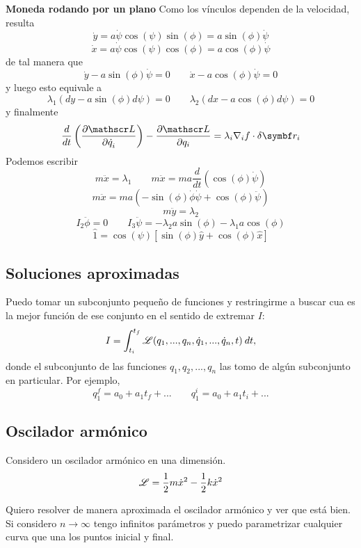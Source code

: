 \documentclass[10pt,oneside]{CBFT_book}
\begin{document}
\begin{ejemplo}{\bf Moneda rodando por un plano}
Como los vínculos dependen de la velocidad, resulta 
\[
	\dot{y} = a\dot{\psi} \cos(\psi) \sin(\phi) = a \sin(\phi) \dot{\psi}
\]
\[
	\dot{x} = a\dot{\psi} \cos(\psi) \cos(\phi) = a \cos(\phi) \dot{\psi}
\]
de tal manera que 
\[
	\dot{y} - a \sin(\phi) \dot{\psi} = 0 \qquad \dot{x} - a \cos(\phi) \dot{\psi} = 0
\]
y luego esto equivale a 
\[
	\lambda_1(dy - a \sin(\phi) d\psi) = 0 \qquad \lambda_2(dx - a \cos(\phi) d\psi)= 0
\]
y finalmente 
\[
	\frac{d}{dt}\left(\dpar{\Lag}{\dot{q}_i}\right) - \dpar{\Lag}{q_i} =
	\lambda_i \nabla_i f \cdot \delta \vb{r}_i
\]
Podemos escribir
\[
	m \ddot{x} = \lambda_1 \qquad m \ddot{x} = m a \frac{d}{dt}( \cos(\phi)\dot{\psi} )
\]
\[
	m \ddot{x} = m a ( -\sin(\phi)\dot{\phi}\dot{\psi} + \cos(\phi)\ddot{\psi} )
\]
\[
	m \ddot{y} = \lambda_2
\]
\[
	I_2\ddot{\phi} = 0 \qquad I_3\ddot{\psi} = - \lambda_2 a \sin(\phi) -\lambda_1 a \cos(\phi)
\]
\[
	\hat{1} = \cos(\psi)[\sin(\phi)\hat{y} + \cos(\phi)\hat{x}]
\]

\label{moneda}
\end{ejemplo}


\subsection{Soluciones aproximadas}

Puedo tomar un subconjunto pequeño de funciones y restringirme a buscar cua es la mejor función de ese conjunto
en el sentido de extremar $I$:
\[
	I = \int_{t_i}^{t_f} \mathscr{L}(q_1,...,q_n,\dot{q}_1,...,\dot{q}_n,t) \: dt,
\]
donde el subconjunto de las funciones $q_1,q_2, ... ,q_n$ las tomo de algún subconjunto en particular.
Por ejemplo,
\[
	q_1^f = a_0 + a_1 t_f + ... \qquad q_1^i = a_0 + a_1 t_i + ...
\]

\subsection{Oscilador armónico}

Considero un oscilador armónico en una dimensión.
\[
	\mathscr{L} = \frac{1}{2} m \dot{x}^2 - \frac{1}{2} k \dot{x}^2
\]

Quiero resolver de manera aproximada el oscilador armónico y ver que está bien.
Si considero $ n \to \infty $ tengo infinitos parámetros y puedo parametrizar cualquier curva que una los puntos
inicial y final.
\end{document}
